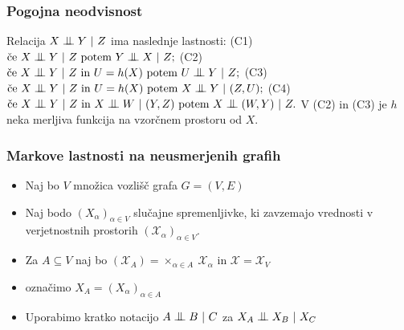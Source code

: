 \documentclass{beamer}
\newcommand{\cond}{\mathrel{\text{\scalebox{1.07}{$\perp\mkern-10mu\perp$}}}}
\begin{document}
\begin{frame}
    \frametitle{Pogojna neodvisnost}
        Relacija $ X \cond Y ~|~ Z$ ima naslednje lastnosti: \newline \newline
        (C1) $\text{če} ~X \cond Y ~|~ Z~ \text{potem}~ Y \cond X ~|~ Z;$\newline \newline
        (C2) $\text{če} ~X \cond Y ~|~ Z~ \text{in} ~U = h(X) ~\text{potem}~ U \cond Y ~|~ Z;$\newline \newline
        (C3) $\text{če} ~X \cond Y ~|~ Z~ \text{in} ~U = h(X) ~\text{potem}~ X \cond Y ~|~ (Z,U);$\newline \newline
        (C4) $\text{če} ~X \cond Y ~|~ Z~ \text{in} ~X \cond W ~|~ (Y,Z) ~\text{potem}~ X \cond (W,Y) ~|~ Z.$\newline \newline
        V (C2) in (C3) je $h$ neka merljiva funkcija na vzorčnem prostoru od $X$.

\end{frame}
\begin{frame}
    \frametitle{Markove lastnosti na neusmerjenih grafih}
    \begin{itemize}
        \item Naj bo $V$ množica vozlišč grafa $G=(V,E)$
        \item Naj bodo $(X_\alpha)_{\alpha \in V}$ slučajne spremenljivke, ki zavzemajo vrednosti
        v verjetnostnih prostorih $(\mathcal{X}_\alpha)_{\alpha \in V}$. 
        \item Za $A \subseteq V$ naj bo $(\mathcal{X}_A) = \times_{\alpha \in A} ~ \mathcal{X}_\alpha$ in $\mathcal{X} = \mathcal{X}_V$
        \item označimo $X_A = (X_\alpha)_{\alpha \in A}$ 
        \item Uporabimo kratko notacijo $A \cond B ~|~ C$ za $X_A \cond X_B ~|~ X_C$
    \end{itemize}
\end{frame}
\end{document}
